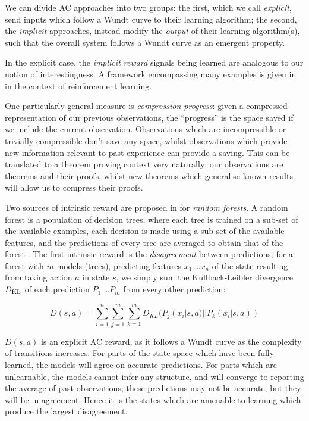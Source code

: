 We can divide AC approaches into two groups: the first, which we call \emph{explicit}, send inputs which follow a Wundt curve to their learning algorithm; the second, the \emph{implicit} approaches, instead modify the \emph{output} of their learning algorithm(s), such that the overall system follows a Wundt curve as an emergent property.

In the explicit case, the \emph{implicit reward} signals being learned are analogous to our notion of interestingness. A framework encompassing many examples is given in \citep{oudeyer2007intrinsic} in the context of reinforcement learning.

One particularly general measure is \emph{compression progress}: given a compressed representation of our previous observations, the ``progress'' is the space saved if we include the current observation. Observations which are incompressible or trivially compressible don't save any space, whilst observations which provide new information relevant to past experience can provide a saving. This can be translated to a theorem proving context very naturally: our observations are theorems and their proofs, whilst new theorems which generalise known results will allow us to compress their proofs.

\citep{Schmidhuber1999}

Two sources of intrinsic reward are proposed in \citep{Hester.Stone:2012} for \emph{random forests}. A random forest is a population of decision trees, where each tree is trained on a sub-set of the available examples, each decision is made using a sub-set of the available features, and the predictions of every tree are averaged to obtain that of the forest \citep{randomforests}. The first intrinsic reward is the \emph{disagreement} between predictions; for a forest with $m$ models (trees), predicting features $x_1$ \dots $x_n$ of the state resulting from taking action $a$ in state $s$, we simply sum the Kullback-Leibler divergence $D_{\rm KL}$ of each prediction $P_1$ \dots $P_m$ from every other prediction:

\begin{equation}
  D(s,a) = \sum_{i = 1}^n \sum_{j = 1}^m \sum_{k = 1}^m D_{KL}(P_j(x_i|s,a) || P_k(x_i|s,a))
\end{equation}

$D(s,a)$ is an explicit AC reward, as it follows a Wundt curve as the complexity of transitions increases. For parts of the state space which have been fully learned, the models will agree on accurate predictions. For parts which are unlearnable, the models cannot infer any structure, and will converge to reporting the average of past observations; these predictions may not be accurate, but they will be in agreement. Hence it is the states which are amenable to learning which produce the largest disagreement.


